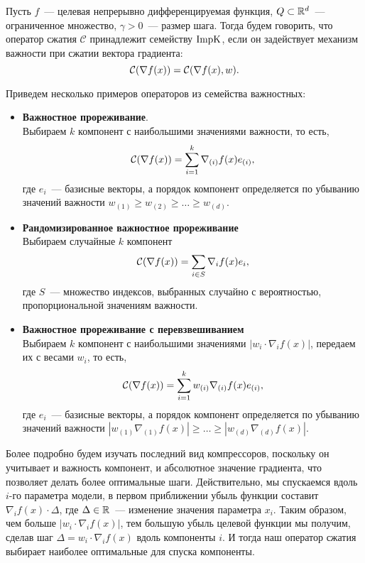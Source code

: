     \begin{definition}
        Пусть $f$~--- целевая непрерывно дифференцируемая функция, $Q \subset \mathbb{R}^d$~--- ограниченное множество, $\gamma > 0$~--- размер шага. Тогда будем говорить, что оператор сжатия $\mathcal{C}$ принадлежит семейству $\operatorname{ImpK}$, если он задействует механизм важности при сжатии вектора градиента:
        \begin{equation}
            {\cal C}(\nabla f(x)) = {\cal C}(\nabla f(x), w).
        \end{equation}
    \end{definition}
    Приведем несколько примеров операторов из семейства важностных:
    \begin{itemize}
        \item \textbf{Важностное прореживание}.\\
        Выбираем $k$ компонент с наибольшими значениями важности, то есть,
        \begin{equation}
            {\cal C}(\nabla f(x)) = \sum_{i=1}^k \nabla_{(i)} f(x) e_{(i)},
        \end{equation}
        где $e_i$~--- базисные векторы, а порядок компонент определяется по убыванию значений важности $w_{(1)} \geq w_{(2)} \geq \dots \geq w_{(d)}$.
        \item \textbf{Рандомизированное важностное прореживание}\\
        Выбираем случайные $k$ компонент 
        \begin{equation}
            {\cal C}(\nabla f(x)) = \sum_{i \in S} \nabla_i f(x) e_i,
        \end{equation}
        где $S$~--- множество индексов, выбранных случайно с вероятностью, пропорциональной значениям важности.
        \item \textbf{Важностное прореживание с перевзвешиванием}\\
        Выбираем $k$ компонент с наибольшими значениями $|w_i \cdot \nabla_i f(x)|$, передаем их с весами $w_i$, то есть,
        \begin{equation}
            {\cal C}(\nabla f(x)) = \sum_{i=1}^k w_{(i)} \nabla_{(i)} f(x) e_{(i)},
        \end{equation}
        где $e_i$~--- базисные векторы, а порядок компонент определяется по убыванию значений важности $|w_{(1)} \nabla_{(1)} f(x)| \geq \dots \geq |w_{(d)} \nabla_{(d)} f(x)|$.
    \end{itemize}
    Более подробно будем изучать последний вид компрессоров, поскольку он учитывает и важность компонент, и абсолютное значение градиента, что позволяет делать более оптимальные шаги. Действительно, мы спускаемся вдоль $i$-го параметра модели, в первом приближении убыль функции составит $\nabla_i f(x) \cdot \Delta$, где $\Delta \in \mathbb{R}$~--- изменение значения параметра $x_i$. Таким образом, чем больше $|w_i \cdot \nabla_i f(x)|$, тем большую убыль целевой функции мы получим, сделав шаг $\Delta = w_i \cdot \nabla_i f(x)$ вдоль компоненты $i$. И тогда наш оператор сжатия выбирает наиболее оптимальные для спуска компоненты.

